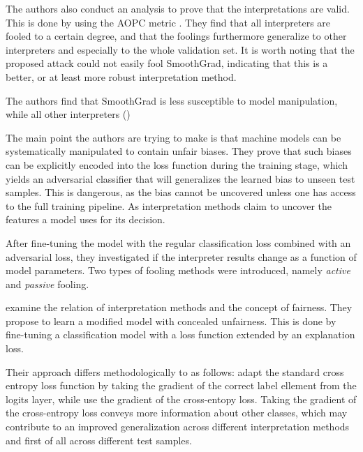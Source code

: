 The authors also conduct an analysis to prove that the interpretations are valid. This is done by using the AOPC metric \cite{samek2016evaluating}. 
They find that all interpreters are fooled to a certain degree, and that the foolings furthermore generalize to other interpreters and especially to the whole validation set. It is worth noting that the proposed attack could not easily fool SmoothGrad, indicating that this is a better, or at least more robust interpretation method. 







The authors find that SmoothGrad is less susceptible to model manipulation, while all other interpreters ()

The main point the authors are trying to make is that machine models can be systematically manipulated to contain unfair biases. They prove that such biases can be explicitly encoded into the loss function during the training stage, which yields an adversarial classifier that will generalizes the learned bias to unseen test samples. This is dangerous, as the bias cannot be uncovered unless one has access to the full training pipeline. As interpretation methods claim to uncover the features a model uses for its decision. 


After fine-tuning the model with the regular classification loss combined with an adversarial loss, they investigated if the interpreter results change as a function of model parameters. 
Two types of fooling methods were introduced, namely \textit{active} and \textit{passive} fooling. 


\mypar{}
\cite{dimanov2020you} examine the relation of interpretation methods and the concept of fairness. They propose to learn a modified model with concealed unfairness. This is done by fine-tuning a classification model with a loss function extended by an explanation loss. 

Their approach differs methodologically to \cite{fooling_nn_interpreters} as follows: 
\cite{fooling_nn_interpreters} adapt the standard cross entropy loss function by taking the gradient of the correct label ellement from the logits layer, while \cite{dimanov2020you} use the gradient of the cross-entopy loss. 
Taking the gradient of the cross-entropy loss conveys more information about other classes, which may contribute to an improved generalization across different interpretation methods and first of all across different test samples. 

